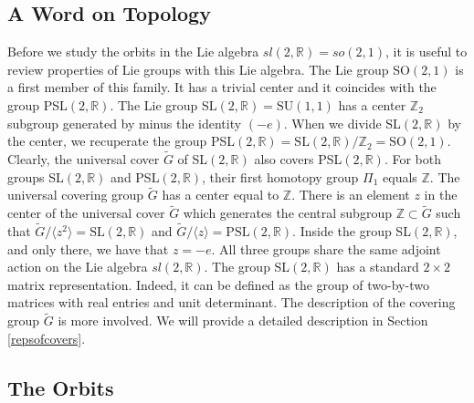 \documentclass[12pt]{article}
\numberwithin{equation}{section}
\numberwithin{equation}{section}
\numberwithin{table}{section}\setlength{\multlinegap}{25pt}
\begin{document}
\subsection{A Word on Topology}
\label{Topology}
Before we study the orbits in the Lie algebra $sl(2,\mathbb{R})=so(2,1)$, it is useful to review properties of Lie groups with this Lie algebra. The Lie group SO$(2,1)$ is a first member of this family. It has a trivial center and it coincides with the group PSL$(2,\mathbb{R})$.  The Lie group   SL$(2,\mathbb{R})=\mathrm{SU}(1,1)$ has a center $\mathbb{Z}_2$ subgroup generated by minus the identity $(-e)$. When we divide SL$(2,\mathbb{R})$ by the center, we recuperate the group PSL$(2,\mathbb{R})=\mathrm{SL}(2,\mathbb{R})/\mathbb{Z}_2=\mathrm{SO}(2,1)$.  Clearly, the universal cover $\widetilde{G}$ of SL$(2,\mathbb{R})$  also covers PSL$(2,\mathbb{R})$. 
For both groups SL$(2,\mathbb{R})$ and PSL$(2,\mathbb{R})$, their first homotopy group $\Pi_1$ equals $\mathbb{Z}$.  
The universal covering group $\widetilde{G}$ has a center equal to $\mathbb{Z}$. 
There is an element $z$ in the center of the universal cover $\widetilde{G}$ which generates the central subgroup $\mathbb{Z} \subset \widetilde{G}$ such that $\widetilde{G}/\langle z^2 \rangle=\mathrm{SL}(2,\mathbb{R})$ and $\widetilde{G}/\langle z \rangle=\mathrm{PSL}(2,\mathbb{R})$. Inside the group SL$(2,\mathbb{R})$, and only there, we have that $z=-e$. All three groups share the same adjoint action on the Lie algebra $sl(2,\mathbb{R})$. The group SL$(2,\mathbb{R})$ has a standard $2 \times 2$ matrix representation. Indeed, it can be defined as the group of two-by-two matrices with real entries and unit determinant. The description of the covering group $\widetilde{G}$ is more involved. We will provide a detailed description in Section \ref{repsofcovers}. 





\subsection{The Orbits}
\end{document}
